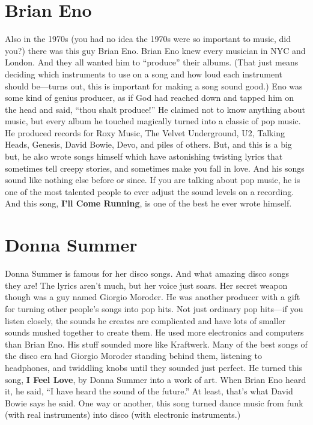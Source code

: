 \documentclass[letterpaper,single]{article}
\begin{document}
\section{Brian Eno}
Also in the 1970s (you had no idea the 1970s were so important to music,
did you?) there was this guy Brian Eno. Brian Eno knew every musician
in NYC and London. And they all wanted him to ``produce'' their albums.
(That just means deciding which instruments to use on a song and how
loud each instrument should be---turns out, this is important for making
a song sound good.) Eno was some kind of genius producer, as if God
had reached down and tapped him on the head and said, ``thou shalt
produce!'' He claimed not to know anything about music, but every album
he touched magically turned into a classic of pop music. He produced
records for Roxy Music, The Velvet Underground, U2, Talking Heads,
Genesis, David Bowie, Devo, and piles of others. But, and this is a big
but, he also wrote songs himself which have astonishing twisting lyrics
that sometimes tell creepy stories, and sometimes make you fall in
love. And his songs sound like nothing else before or since. If you are
talking about pop music, he is one of the most talented people to ever
adjust the sound levels on a recording. And this song, \textbf{I'll Come
Running}, is one of the best he ever wrote himself.

\section{Donna Summer}
Donna Summer is famous for her disco songs. And what amazing disco songs
they are! The lyrics aren't much, but her voice just soars. Her secret
weapon though was a guy named Giorgio Moroder. He was another producer
with a gift for turning other people's songs into pop hits. Not just
ordinary pop hits---if you listen closely, the sounds he creates are
complicated and have lots of smaller sounds mushed together to create
them. He used more electronics and computers than Brian Eno. His stuff
sounded more like Kraftwerk. Many of the best songs of the disco era
had Giorgio Moroder standing behind them, listening to headphones, and
twiddling knobs until they sounded just perfect. He turned this song,
\textbf{I Feel Love}, by Donna Summer into a work of art. When Brian Eno
heard it, he said, ``I have heard the sound of the future.'' At least,
that's what David Bowie says he said. One way or another, this song
turned dance music from funk (with real instruments) into disco (with
electronic instruments.)
\end{document}
